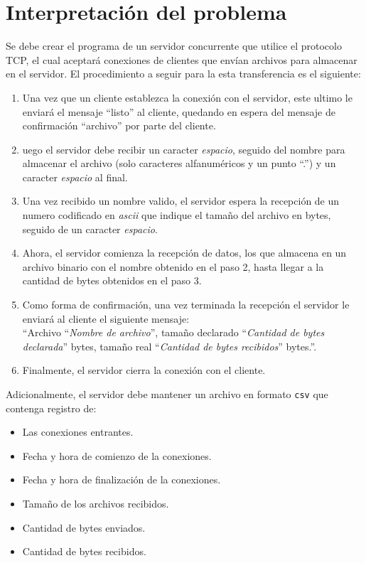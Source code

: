 \section{Interpretación del problema}

Se debe crear el programa de un servidor concurrente que utilice el protocolo TCP, el cual aceptará conexiones de clientes que envían archivos para almacenar en el servidor. El procedimiento a seguir para la esta transferencia es el siguiente:

\begin{enumerate}\bfseries
    \item \textnormal{Una vez que un cliente establezca la conexión con el servidor, este ultimo le enviará el mensaje ``listo'' al cliente, quedando en espera del mensaje de confirmación ``archivo'' por parte del cliente.}
    \item \textnormal{uego el servidor debe recibir un caracter \textit{espacio}, seguido del nombre para almacenar el archivo (solo caracteres alfanuméricos y un punto ``.'') y un caracter \textit{espacio} al final.}
    \item \textnormal{Una vez recibido un nombre valido, el servidor espera la recepción de un numero codificado en \textit{ascii} que indique el tamaño del archivo en bytes, seguido de un caracter \textit{espacio}.}
    \item \textnormal{Ahora, el servidor comienza la recepción de datos, los que almacena en un archivo binario con el nombre obtenido en el paso 2, hasta llegar a la cantidad de bytes obtenidos en el paso 3.}
    \item \textnormal{Como forma de confirmación, una vez terminada la recepción el servidor le enviará al cliente el siguiente mensaje:\\
     ``Archivo \enquote{\textit{Nombre de archivo}}, tamaño declarado \enquote{\textit{Cantidad de bytes declarada}} bytes, tamaño real \enquote{\textit{Cantidad de bytes recibidos}} bytes.''.}
    \item \textnormal{Finalmente, el servidor cierra la conexión con el cliente.}\\ 
\end{enumerate}

Adicionalmente, el servidor debe mantener un archivo en formato \texttt{csv} que contenga registro de:

\begin{itemize}
    \item Las conexiones entrantes.
    \item Fecha y hora de comienzo de la conexiones.
    \item Fecha y hora de finalización de la conexiones.
    \item Tamaño de los archivos recibidos.
    \item Cantidad de bytes enviados.
    \item Cantidad de bytes recibidos.\\
\end{itemize}

